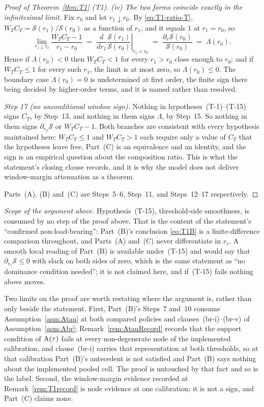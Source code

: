 \begin{proof}[Proof of Theorem~\ref{thm:T1} (T1)]
\emph{(iv) The two forms coincide exactly in the infinitesimal limit.} Fix $r_0$ and let
$r_1 \downarrow r_0$. By \eqref{eq:T1-ratio-T}, $W_T C_T = \mathcal S(r_1)/\mathcal S(r_0)$ as a
function of $r_1$, and it equals $1$ at $r_1 = r_0$, so
\[
\lim_{r_1\downarrow r_0}\frac{W_TC_T-1}{r_1-r_0}
\;=\; \frac{d}{dr_1}\left.\frac{\mathcal S(r_1)}{\mathcal S(r_0)}\right|_{r_1=r_0}
\;=\; \frac{\partial_r\mathcal S(r_0)}{\mathcal S(r_0)} \;=\; \Lambda(r_0).
\]
Hence if $\Lambda(r_0) < 0$ then $W_TC_T < 1$ for every $r_1 > r_0$ close enough to $r_0$; and if
$W_TC_T \le 1$ for every such $r_1$, the limit is at most zero, so $\Lambda(r_0) \le 0$. The
boundary case $\Lambda(r_0) = 0$ is undetermined at first order, the finite sign there being decided
by higher-order terms, and it is named rather than resolved.

\emph{Step 17 (no unconditional window sign).} Nothing in hypotheses~(T-1)--(T-15) signs $C_T$, by
Step~13, and nothing in them signs $\Lambda$, by Step~15. So nothing in them signs
$\partial_{r_T}\mathcal S$ or $W_TC_T - 1$. Both branches are consistent with every hypothesis
maintained here: $W_TC_T \le 1$ and $W_TC_T > 1$ each require only a value of $C_T$ that the
hypotheses leave free. Part~(C) is an equivalence and an identity, and the sign is an empirical
question about the composition ratio. This is what the statement's closing clause records, and it is
why the model does not deliver window-margin attenuation as a theorem.

Parts~(A), (B) and~(C) are Steps~5--6, Step~11, and Steps~12--17 respectively.
\end{proof}

\medskip
\noindent\emph{Scope of the argument above.}
Hypothesis~(T-15), threshold-side smoothness, is consumed by no step of the proof above. That is the
content of the statement's ``confirmed non-load-bearing'': Part~(B)'s conclusion \eqref{eq:T1B} is a
finite-difference comparison throughout, and Parts~(A) and~(C) never differentiate in $r_\tau$. A
smooth local reading of Part~(B) is available under~(T-15) and would say that
$\partial_{r_\tau}\mathcal S \le 0$ with slack on both sides of zero, which is the same statement as
``no dominance condition needed''; it is not claimed here, and if~(T-15) fails nothing above moves.

Two limits on the proof are worth restating where the argument is, rather than only beside the
statement. First, Part~(B)'s Steps~7 and~10 consume Assumption~\ref{asm:Atau} at both compared
policies and clauses~(br-i)--(br-v) of Assumption~\ref{asm:Abr}; Remark~\ref{rem:AtauRecord} records
that the support condition of $\mathrm{A}(\tau)$ fails at every non-degenerate node of the implemented
calibration, and clause~(br-i) carries that representation at both thresholds, so at that
calibration Part~(B)'s antecedent is not satisfied and Part~(B) says nothing about the implemented
pooled cell. The proof is untouched by that fact and so is the label. Second, the window-margin
evidence recorded at Remark~\ref{rem:T1record} is node evidence at one calibration; it is not a
sign, and Part~(C) claims none.

